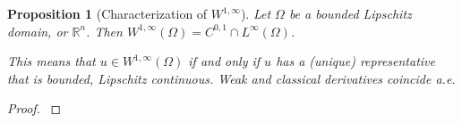 \documentclass[english,a4paper,9pt,oneside]{scrbook}	%
\theoremstyle{break}
\newtheorem{lemma}[equation]{Lemma}
\newtheorem{prop}[equation]{Proposition}
\newenvironment{mproof}[1][\proofname]{%
  \begin{proof}[#1]$ $\par\nobreak\ignorespaces
}{%
  \end{proof}
}
\renewcommand*{\proofname}{Proof}
\theoremstyle{remark}
\newcommand{\mR}{\mathbb{R}}
\newcommand{\norm}[1]{\left\lVert#1\right\rVert}
\begin{document}
\begin{appendices}
%
%
%
%
%
%
%
%

\begin{prop}[Characterization of $W^{1,\infty}$]
\label{prop:lip}
Let $\Omega$ be a bounded Lipschitz domain, or $\mathbb{R}^n$. Then $W^{1,\infty}(\Omega) = C^{0,1}\cap L^\infty(\Omega)$.

This means that $u\in W^{1,\infty}(\Omega)$ if and only if $u$ has a (unique) representative that is bounded, Lipschitz continuous. Weak and classical derivatives coincide a.e.
\end{prop}
\begin{mproof}


\end{mproof}
\end{appendices}
\end{document}
